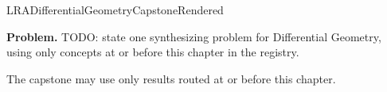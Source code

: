 \ifcsname LRADifferentialGeometryCapstoneRendered\endcsname
\else
\expandafter\gdef\csname LRADifferentialGeometryCapstoneRendered\endcsname{}

\newpage
{}
\label{cap:differential-geometry}

\begin{tcolorbox}[
  colback=gray!6,
  colframe=gray!40,
  arc=2pt,
  left=8pt, right=8pt, top=6pt, bottom=6pt,
  title={\small\textbf{Capstone Problem}},
  fonttitle=\small\bfseries
]
\textbf{Problem.}
TODO: state one synthesizing problem for Differential Geometry, using only concepts at or
before this chapter in the registry.
\end{tcolorbox}

\begin{remark*}
The capstone may use only results routed at or before this chapter.
\end{remark*}

\clearpage
\fi
